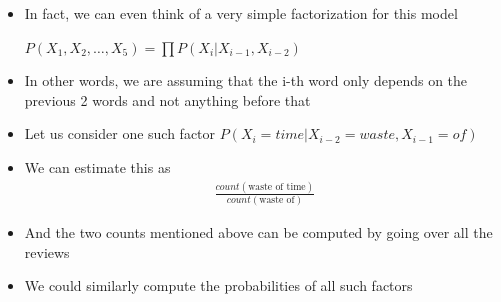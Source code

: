 \begin{frame}
\begin{columns}
		\begin{overlayarea}{\textwidth}{\textheight}
			\vspace{-3mm}
			\begin{itemize}\justifying
				\item<1-> In fact, we can even think of a very simple factorization for this model\\
				\begin{center}
					$ P(X_1, X_2,\dots, X_{5}) = \prod P(X_i| X_{i-1}, X_{i-2}) $
				\end{center}
				\item<2->In other words, we are assuming that the i-th word only depends on the previous 2 words and not anything before that
				\item<3-> Let us consider one such factor $P(X_i = time| X_{i-2} = waste, X_{i-1} = of)$
				\item<4-> We can estimate this as
					\begin{align*}
						\frac{count(\text{waste of time})}{count(\text{waste of})}
					\end{align*}
				\item<5-> And the two counts mentioned above can be computed by going over all the reviews
				\item<6-> We could similarly compute the probabilities of all such factors	
			\end{itemize}
		\end{overlayarea}
	\end{columns}
\end{frame}


